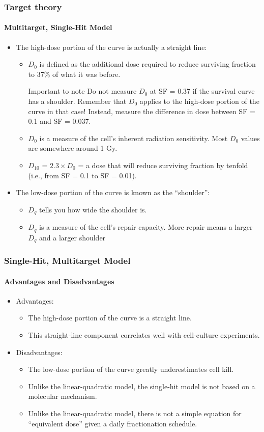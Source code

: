 \documentclass{beamer}
\begin{document}
\begin{frame}
  \frametitle{Target theory}
  \framesubtitle{Multitarget, Single-Hit Model}
  \begin{itemize}
    \item The high-dose portion of the curve is actually a straight line:
    \begin{itemize}
      \item $D_0$ is defined as the additional dose required to reduce surviving fraction to  37\% of what it was before.
      \begin{alertblock}{Important to note}
        Do not measure $D_0$ at SF = 0.37 if the survival curve has a shoulder. Remember that $D_0$ applies to the high-dose portion of the curve in that case! Instead, measure the difference in dose between SF = 0.1 and SF = 0.037.
      \end{alertblock}
      \item $D_0$ is a measure of the cell’s inherent radiation sensitivity. Most $D_0$ values are somewhere around 1 Gy.
      \item $D_{10}$ = $2.3 \times D_0$ = a dose that will reduce surviving fraction by tenfold (i.e., from  SF = 0.1 to SF = 0.01).
    \end{itemize}
\item The low-dose portion of the curve is known as the “shoulder”:
    \begin{itemize}
      \item $D_q$ tells you how wide the shoulder is.
      \item $D_q$ is a measure of the cell's repair capacity. More repair means a larger $D_q$  and a larger shoulder
    \end{itemize}
  \end{itemize}
\end{frame}



\begin{frame}
  \frametitle{Single-Hit, Multitarget Model}
  \framesubtitle{Advantages and Disadvantages}
  \begin{itemize}
    \item Advantages:
    \begin{itemize}
      \item The high-dose portion of the curve is a straight line.
      \item This straight-line component correlates well with cell-culture experiments.
  \end{itemize}
  \item Disadvantages:
  \begin{itemize}
    \item The low-dose portion of the curve greatly underestimates cell kill.
    \item Unlike the linear-quadratic model, the single-hit model is not based on a  molecular mechanism.
    \item Unlike the linear-quadratic model, there is not a simple equation for “equivalent dose” given a daily fractionation schedule.
  \end{itemize}
  \end{itemize}

\end{frame}
\end{document}

